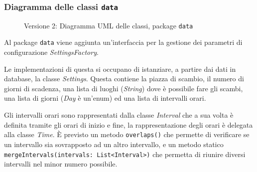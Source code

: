 \subsubsection{Diagramma delle classi \texttt{data}}
\vspace{0.5cm}
\begin{figure}[H]
    \centering
    \caption{Versione 2: Diagramma UML delle classi, package \texttt{data}}
    \label{fig:class_data_v_2}
\end{figure}

Al package \texttt{data} viene aggiunta un'interfaccia per la gestione dei parametri di configurazione \textit{SettingsFactory}.

Le implementazioni di questa si occupano di istanziare, a partire dai dati in database, la classe \textit{Settings}.
Questa contiene la piazza di scambio, il numero di giorni di scadenza, una lista di luoghi (\textit{String}) dove è possibile fare gli scambi,
una lista di giorni (\textit{Day} è un'enum) ed una lista di intervalli orari.

Gli intervalli orari sono rappresentati dalla classe \textit{Interval} che a sua volta è definita tramite gli orari di inizio e fine, la rappresentazione
degli orari è delegata alla classe \textit{Time}. È previsto un metodo \texttt{overlaps()} che permette di verificare se un intervallo sia sovrapposto
ad un altro intervallo, e un metodo statico \texttt{mergeIntervals(intervals: List<Interval>)} che permetta di riunire diversi intervalli nel minor numero possibile.